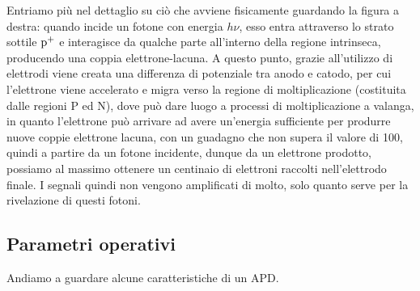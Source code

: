 Entriamo più nel dettaglio su ciò che avviene fisicamente guardando la figura a destra: quando incide un fotone con energia $h \nu$, esso entra attraverso lo strato sottile $\rm p^{+}$ e interagisce da qualche parte all'interno della regione intrinseca, producendo una coppia elettrone-lacuna. A questo punto, grazie all'utilizzo di elettrodi viene creata una differenza di potenziale tra anodo e catodo, per cui l'elettrone viene accelerato e migra verso la regione di moltiplicazione (costituita dalle regioni P ed N), dove può dare luogo a processi di moltiplicazione a valanga, in quanto l'elettrone può arrivare ad avere un'energia sufficiente per produrre nuove coppie elettrone lacuna, con un guadagno che non supera il valore di 100, quindi a partire da un fotone incidente, dunque da un elettrone prodotto, possiamo al massimo ottenere un centinaio di elettroni raccolti nell'elettrodo finale. I segnali quindi non vengono amplificati di molto, solo quanto serve per la rivelazione di questi fotoni.

\subsection{Parametri operativi}
Andiamo a guardare alcune caratteristiche di un APD.

